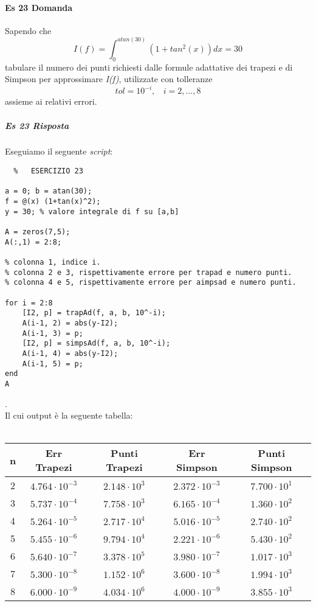 \documentclass[a4paper]{report}
\begin{document}
\paragraph{Es 23 Domanda}
Sapendo che\\
\[
I(f) = \int_{0}^{atan(30)}(1+tan^2(x))dx=30
\]
tabulare il numero dei punti richiesti dalle formule adattative dei trapezi e di Simpson per approssimare \emph{I(f)}, utilizzate con tolleranze
\[
tol = 10^{-i}, \ \ \ \ i=2,...,8
\]
assieme ai relativi errori.
\subparagraph{Es 23 Risposta}
Eseguiamo il seguente \emph{script}:\\
\begin{lstlisting}	%	ESERCIZIO 23

a = 0; b = atan(30);
f = @(x) (1+tan(x)^2);
y = 30; % valore integrale di f su [a,b]

A = zeros(7,5);
A(:,1) = 2:8;

% colonna 1, indice i.
% colonna 2 e 3, rispettivamente errore per trapad e numero punti.
% colonna 4 e 5, rispettivamente errore per aimpsad e numero punti.

for i = 2:8
	[I2, p] = trapAd(f, a, b, 10^-i);
	A(i-1, 2) = abs(y-I2);
	A(i-1, 3) = p;
	[I2, p] = simpsAd(f, a, b, 10^-i);
	A(i-1, 4) = abs(y-I2);
	A(i-1, 5) = p;
end
A
\end{lstlisting}
.\\ Il cui output è la seguente tabella:\\ \\
\begin{tabular}{|c|c|c|c|c|}
	\hline
	n&Err Trapezi&Punti Trapezi&Err Simpson&Punti Simpson\\ \hline
	2&$4.764 \cdot 10^{-3} $&$  2.148 \cdot 10^{3} $&$ 2.372 \cdot 10^{-3} $&$ 7.700 \cdot 10^{1} $\\ \hline
3&$5.737 \cdot 10^{-4} $&$  7.758 \cdot 10^{3} $&$ 6.165 \cdot 10^{-4} $&$ 1.360 \cdot 10^{2} $\\ \hline
4&$5.264 \cdot 10^{-5} $&$  2.717 \cdot 10^{4} $&$ 5.016 \cdot 10^{-5} $&$ 2.740 \cdot 10^{2} $\\ \hline
5&$5.455 \cdot 10^{-6} $&$  9.794 \cdot 10^{4} $&$ 2.221 \cdot 10^{-6} $&$ 5.430 \cdot 10^{2} $\\ \hline
6&$5.640 \cdot 10^{-7} $&$  3.378 \cdot 10^{5} $&$ 3.980 \cdot 10^{-7} $&$ 1.017 \cdot 10^{3} $\\ \hline
7&$5.300 \cdot 10^{-8} $&$  1.152 \cdot 10^{6} $&$ 3.600 \cdot 10^{-8} $&$ 1.994 \cdot 10^{3} $\\ \hline
8&$6.000 \cdot 10^{-9} $&$  4.034 \cdot 10^{6} $&$ 4.000 \cdot 10^{-9} $&$ 3.855 \cdot 10^{3} $\\ \hline
\end{tabular}
\newpage
\end{document}
